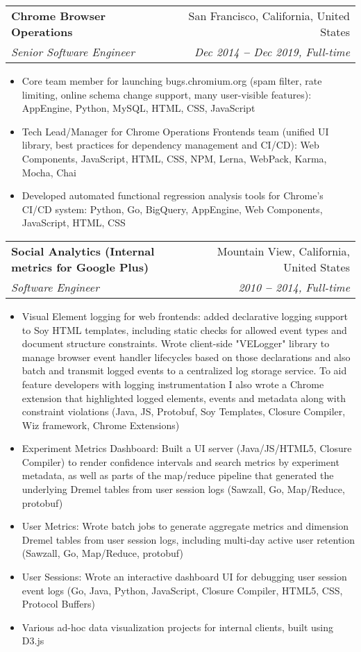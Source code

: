 \documentclass[letterpaper,11pt]{article}
\makeatletter
\newcommand{\resumeItem}[1]{
  \item\small{
    {#1 \vspace{-2pt}}
  }
}
\newcommand{\resumeSubheading}[4]{
  \vspace{-2pt}\item
    \begin{tabular*}{0.97\textwidth}[t]{l@{\extracolsep{\fill}}r}
      \textbf{#1} & #2 \\
      \textit{\small#3} & \textit{\small #4} \\
    \end{tabular*}\vspace{-7pt}
}
\newcommand{\resumeItemListStart}{\begin{itemize}}
\newcommand{\resumeItemListEnd}{\end{itemize}\vspace{-5pt}}
\makeatother
\begin{document}
    \resumeSubheading
      {Chrome Browser Operations}{San Francisco, California, United States}
      {Senior Software Engineer}{Dec 2014 \textbf{--} Dec 2019, Full-time}
      \resumeItemListStart
          \resumeItem{Core team member for launching bugs.chromium.org (spam filter, rate limiting, online schema change support, many user-visible features): AppEngine, Python, MySQL, HTML, CSS, JavaScript}
          \resumeItem{Tech Lead/Manager for Chrome Operations Frontends team (unified UI library, best practices for dependency management and CI/CD): Web Components, JavaScript, HTML, CSS, NPM, Lerna, WebPack, Karma, Mocha, Chai }
          \resumeItem{Developed automated functional regression analysis tools for Chrome's CI/CD system: Python, Go, BigQuery, AppEngine, Web Components, JavaScript, HTML, CSS}
      \resumeItemListEnd

    \resumeSubheading
    {Social Analytics (Internal metrics for Google Plus)}{Mountain View, California, United States}
    {Software Engineer}{2010 \textbf{--} 2014, Full-time}
        \resumeItemListStart
            \resumeItem{Visual Element logging for web frontends: added declarative logging support to Soy HTML templates, including static checks for allowed event types and document structure constraints. 
            Wrote client-side "VELogger" library to manage browser event handler lifecycles based on those declarations and also batch and transmit logged events to a centralized log storage service. 
            To aid feature developers with logging instrumentation I also wrote a Chrome extension that highlighted logged elements, events and metadata along with constraint violations (Java, JS, Protobuf, Soy Templates, Closure Compiler, Wiz framework, Chrome Extensions)}
            \resumeItem{Experiment Metrics Dashboard: Built a UI server (Java/JS/HTML5, Closure Compiler) to render confidence intervals and search metrics by experiment metadata, 
            as well as parts of the map/reduce pipeline that generated the underlying Dremel tables from user session logs (Sawzall, Go, Map/Reduce, protobuf)}
            \resumeItem{User Metrics: Wrote batch jobs to generate aggregate metrics and dimension Dremel tables from user session logs, including multi-day active user retention (Sawzall, Go, Map/Reduce, protobuf) }
            \resumeItem{User Sessions: Wrote an interactive dashboard UI for debugging user session event logs (Go, Java, Python, JavaScript, Closure Compiler, HTML5, CSS, Protocol Buffers)}
            \resumeItem{Various ad-hoc data visualization projects for internal clients, built using D3.js }
        \resumeItemListEnd
  
\end{document}
